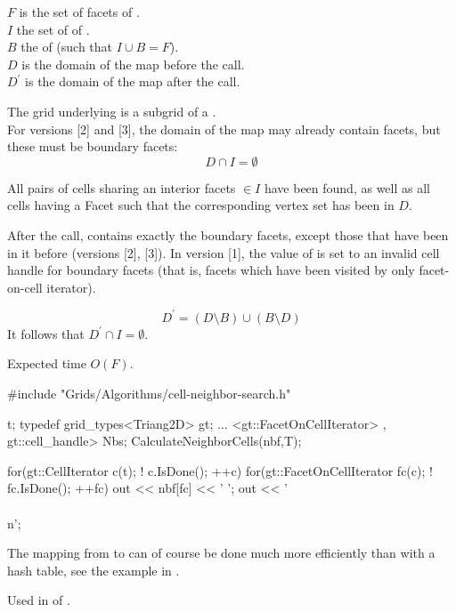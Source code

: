 $F$ is the set of facets of .
\\
$I$  the set of  
of  .
\\$B$ the  of  
(such that $I \cup B = F$).
\\
$D$ is the domain of the map  before the call.
\\
$D^\prime$ is the domain of the map  after the call.

The grid underlying  is a 
subgrid of a .
\\
For versions [2] and [3],
the domain of the map 
 may already contain facets,
but these must be  boundary facets:
\[
   D \cap I = \emptyset
\]

All pairs of cells sharing an interior facets $\in I$ have been found,
as well as all cells having a Facet such that the corresponding 
vertex set has been in $D$.

After the call, 
contains exactly the boundary facets,
except those that have been in it before (versions [2], [3]).
In version [1], the value of  is set to an invalid cell handle
for boundary facets (that is, facets which have been visited by only
facet-on-cell iterator).


\[
  D^\prime = (D \setminus B) \cup (B \setminus D)
\]
It follows that  $D^\prime \cap I = \emptyset$.

Expected time $O(F)$.

\begin{example}
#include "Grids/Algorithms/cell-neighbor-search.h"

 t;
typedef grid_types<Triang2D> gt;
...
<gt::FacetOnCellIterator> , gt::cell_handle> Nbs;
CalculateNeighborCells(nbf,T);

for(gt::CellIterator c(t); ! c.IsDone(); ++c) {
  for(gt::FacetOnCellIterator fc(c); ! fc.IsDone(); ++fc)
    out << nbf[fc] << ' ';
  out << '\\\\n';
}
\end{example}
The mapping from  to 
can of course be done much more efficiently than with a hash table, see
the example in  .


Used in 
of .



